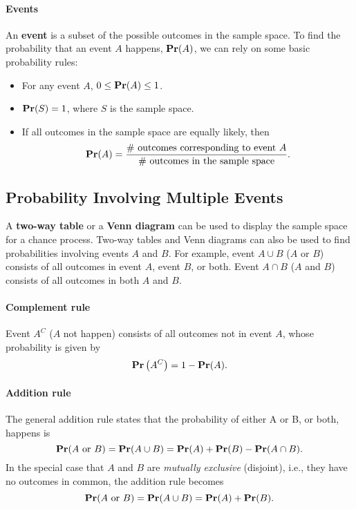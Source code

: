 \paragraph{Events}
An \textbf{event} is a subset of the possible outcomes in the sample space. To find the probability that an event $A$ happens, $\mathop{\mathbf{Pr}}(A)$, we can rely on some basic probability rules:

\begin{itemize}[style=nextline, itemsep=0cm]
\item For any event $A$, $0 \leq \mathop{\mathbf{Pr}}(A) \leq 1$.
\item $\mathop{\mathbf{Pr}}(S) = 1$, where $S$ is the sample space.
\item If all outcomes in the sample space are equally likely, then
    $$
        \mathop{\mathbf{Pr}}(A) = \dfrac{
            \text{\# outcomes corresponding to event $A$}
        }{
            \text{\# outcomes in the sample space}
        }.
    $$
\end{itemize}

\subsection{Probability Involving Multiple Events}
A \textbf{two-way table} or a \textbf{Venn diagram} can be used to display the sample space for a chance process. Two-way tables and Venn diagrams can also be used to find probabilities involving events $A$ and $B$. For example, event $A \cup B$ ($A$ or $B$) consists of all outcomes in event $A$, event $B$, or both. Event $A \cap B$ ($A$ and $B$) consists of all outcomes in both $A$ and $B$.

\paragraph{Complement rule}
Event $A^C$ ($A$ not happen) consists of all outcomes not in event $A$, whose probability is given by
$$
    \mathop{\mathbf{Pr}}\left( A^C \right) = 1 - \mathop{\mathbf{Pr}}(A).
$$

\paragraph{Addition rule}
The general addition rule states that the probability of either A or B, or both, happens is
$$
    \mathop{\mathbf{Pr}}(\text{$A$ or $B$})
    = \mathop{\mathbf{Pr}}(A \cup B)
    = \mathop{\mathbf{Pr}}(A) + \mathop{\mathbf{Pr}}(B) - \mathop{\mathbf{Pr}}(A \cap B).
$$
In the special case that $A$ and $B$ are \textit{mutually exclusive} (disjoint), i.e., they have no outcomes in common, the addition rule becomes
$$
    \mathop{\mathbf{Pr}}(\text{$A$ or $B$})
    = \mathop{\mathbf{Pr}}(A \cup B)
    = \mathop{\mathbf{Pr}}(A) + \mathop{\mathbf{Pr}}(B).
$$

